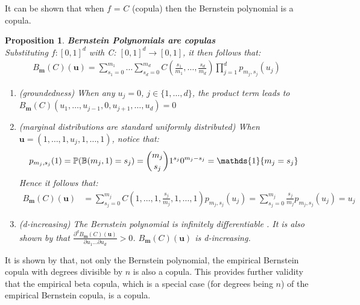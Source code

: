 \documentclass[12pt]{report}
\newtheorem{proposition}{Proposition}[section]
\newcommand{\1}{\mathbf{1}}
\begin{document}
\begin{flushleft}
It can be shown that when $f$ = $C$ (copula) then the Bernstein polynomial is a copula.

\begin{proposition}\label{BersteinPolynomialCopula}
\textit{\normalfont\parencite{SegersEBC}}\:
\textbf{Bernstein Polynomials are copulas} \\
Substituting $f: [0,1]^{d}$ with C: $[0,1]^{d} \rightarrow [0,1]$, it then follows that:
\begin{align*}
B_{\textbf{m}}(C)(\textbf{u}) = \sum\limits_{s_{1} = 0}^{m_{1}} \dots \sum\limits_{s_{d} = 0}^{m_{d}} C \left(\frac{s_{1}}{m_{1}}, \dots, \frac{s_{d}}{m_{d}} \right) \prod\limits_{j = 1}^{d} p_{m_{j},s_{j}}(u_{j})
\end{align*}
\begin{enumerate}
\item (groundedness) When any $u_{j} = 0$, $j \in \{1, \dots, d\}$, the product term leads to $B_{\textbf{m}}(C)(u_{1}, \dots, u_{j-1}, 0, u_{j+1}, \dots, u_{d}) = 0$
\item (marginal distributions are standard uniformly distributed) When $\textbf{u} = (1, \dots, 1, u_{j}, 1, \dots, 1)$, notice that:
\begin{align*}
p_{m_{j},s_{j}}(1) = \mathbb{P}(\mathbb{B}(m_{j},1) = s_{j}) = \dbinom{m_{j}}{s_{j}} 1^{s_{j}} 0^{m_{j}-s_{j}} = \mathds{1}\{m_{j} = s_{j}\}
\end{align*}
Hence it follows that:
\begin{align*}
B_{\textbf{m}}(C)(\textbf{u}) &= \sum\limits_{s_{j} = 0}^{m_{j}} C(1, \dots, 1, \frac{s_{j}}{m_{j}}, 1, \dots, 1) p_{m_{j},s_{j}}(u_{j}) = \sum\limits_{s_{j} = 0}^{m_{j}} \frac{s_{j}}{m_{j}} p_{m_{j},s_{j}}(u_{j}) = u_{j}
\end{align*}
\item (d-increasing) The Bernstein polynomial is infinitely differentiable \parencite{SegersEBC}. It is also shown by \cite{SegersEBC} that $\frac{\partial^{d} B_{\textbf{m}}(C)(\textbf{u})}{\partial u_{1} \dots \partial u_{d}} > 0$. $B_{\textbf{m}}(C)(\textbf{u})$ is d-increasing.
\end{enumerate}
\end{proposition}

It is shown by \cite{SegersEBC} that, not only the Bernstein polynomial, the empirical Bernstein copula with degrees divisible by $n$ is also a copula. This provides further validity that the empirical beta copula, which is a special case (for degrees being $n$) of the empirical Bernstein copula, is a copula.


\end{flushleft}
\end{document}
